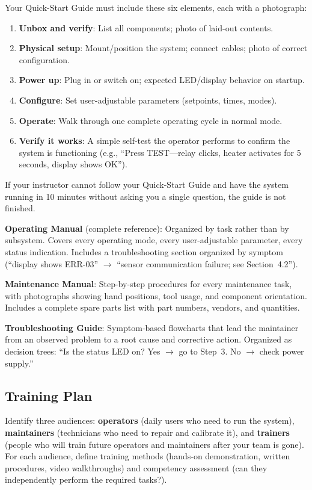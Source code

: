 \documentclass[11pt,letterpaper,twoside,openany]{book}
\begin{document}
\begin{tipbox}
Your Quick-Start Guide must include these six elements, each with a photograph:
\begin{enumerate}[nosep]
\item \textbf{Unbox and verify}: List all components; photo of laid-out contents.
\item \textbf{Physical setup}: Mount/position the system; connect cables; photo of correct configuration.
\item \textbf{Power up}: Plug in or switch on; expected LED/display behavior on startup.
\item \textbf{Configure}: Set user-adjustable parameters (setpoints, times, modes).
\item \textbf{Operate}: Walk through one complete operating cycle in normal mode.
\item \textbf{Verify it works}: A simple self-test the operator performs to confirm the system is functioning (e.g., ``Press TEST---relay clicks, heater activates for 5 seconds, display shows OK'').
\end{enumerate}
If your instructor cannot follow your Quick-Start Guide and have the system running in 10 minutes without asking you a single question, the guide is not finished.
\end{tipbox}

\textbf{Operating Manual} (complete reference): Organized by task rather than by subsystem. Covers every operating mode, every user-adjustable parameter, every status indication. Includes a troubleshooting section organized by symptom (``display shows ERR-03'' $\to$ ``sensor communication failure; see Section~4.2'').

\textbf{Maintenance Manual}: Step-by-step procedures for every maintenance task, with photographs showing hand positions, tool usage, and component orientation. Includes a complete spare parts list with part numbers, vendors, and quantities.

\textbf{Troubleshooting Guide}: Symptom-based flowcharts that lead the maintainer from an observed problem to a root cause and corrective action. Organized as decision trees: ``Is the status LED on? Yes $\to$ go to Step~3. No $\to$ check power supply.''

\subsection{Training Plan}
Identify three audiences: \textbf{operators} (daily users who need to run the system), \textbf{maintainers} (technicians who need to repair and calibrate it), and \textbf{trainers} (people who will train future operators and maintainers after your team is gone). For each audience, define training methods (hands-on demonstration, written procedures, video walkthroughs) and competency assessment (can they independently perform the required tasks?).
\end{document}
